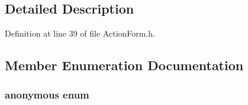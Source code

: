 \subsection{Detailed Description}




Definition at line 39 of file Action\-Form.h.

\subsection{Member Enumeration Documentation}
\subsubsection{\setlength{\rightskip}{0pt plus 5cm}anonymous enum\hspace{0.3cm}{\tt  [private]}}\label{class_action_form_8c4a8f00b8ab214a478f16b162b98b01}


